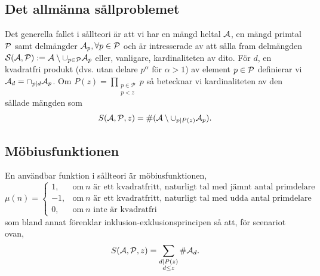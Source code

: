 

\subsection{Det allmänna sållproblemet}
Det generella fallet i sållteori är att vi har en mängd heltal \(\A\), en mängd primtal \(\P\) samt delmängder \(\A_p, \forall p \in \P\) och är intresserade av att sålla fram delmängden \(\mathcal{S}(\A, \P) := \A \setminus \cup_{p \in \P} \A_p\) eller, vanligare, kardinaliteten av dito. För \(d\), en kvadratfri produkt (dvs. utan delare \(p^\alpha\) för \(\alpha > 1\)) av element \(p \in \P\) definierar vi \(\A_d = \cap_{p \divides d} \A_p\). Om \(P(z) = \prod_{\substack{p\in \mathcal{P} \\ p < z}} p\) så betecknar vi kardinaliteten av den sållade mängden som
\begin{align*}
    \S{A}{P}{z} = \card{(\A \setminus \cup_{p \divides P(z)} \A_p)} .
\end{align*}



\subsection{Möbiusfunktionen}
En användbar funktion i sållteori är möbiusfunktionen,
\begin{equation*}
    \mu(n) = 
    \begin{cases}
        1, & \text{om}\ n \text{ är ett kvadratfritt, naturligt tal med jämnt antal primdelare}\\
        -1, & \text{om}\ n \text{ är ett kvadratfritt, naturligt tal med udda antal primdelare}\\
        0, & \text{om}\ n \text{ inte är kvadratfri}
    \end{cases}
\end{equation*}
som bland annat förenklar inklusion-exklusionsprincipen så att, för scenariot ovan,
\begin{align*}
    \S{A}{P}{z} = \sum_{\substack{d \divides P(z) \\ d \leq z}} \card{\A_d} . %
\end{align*} %

